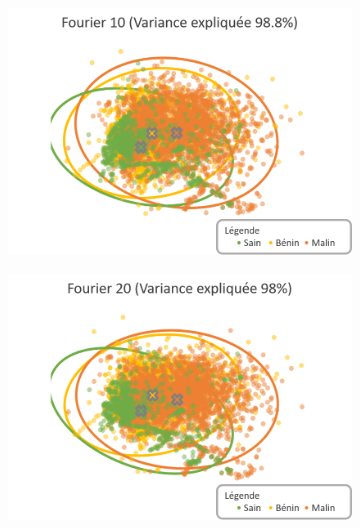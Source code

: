 \begin{figure}[p]
    \centering
    \begin{subfigure}{.49\textwidth}
      \includegraphics[width=\textwidth]{contents/chapter_5/resources/visualisation_frequency_Fourier10.png}
    \end{subfigure}
    \begin{subfigure}{.49\textwidth}
      \includegraphics[width=\textwidth]{contents/chapter_5/resources/visualisation_frequency_Fourier20.png}
    \end{subfigure}
    

\end{figure}
